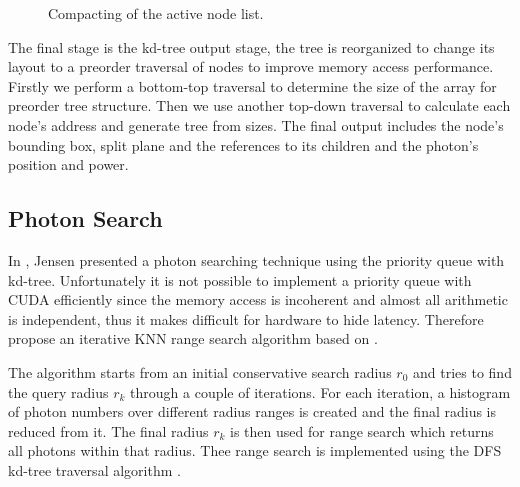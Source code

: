 \begin{figure}[ftp] 
    \centering 
    \renewcommand{\thefigure}{\thechapter.\arabic{figure}}
    \caption[]{Compacting of the active node list.}
    \label{fig:compact_active_list} 
\end{figure} 

The final stage is the kd-tree output stage, the tree is reorganized to change its layout to a preorder traversal of nodes to improve memory access performance. Firstly we perform a bottom-top traversal to determine the size of the array for preorder tree structure. Then we use another top-down traversal to calculate each node's address and generate tree from sizes. The final output includes the node's bounding box, split plane and the references to its children and the photon's position and power. 

\subsection{Photon Search}
In \cite{HenrikWannJensen2004}, Jensen presented a photon searching technique using the priority queue with kd-tree. Unfortunately it is not possible to implement a priority queue with CUDA efficiently since the memory access is incoherent and almost all arithmetic is independent, thus it makes difficult for hardware to hide latency. Therefore \citeauthor{Zhou2008} propose an iterative KNN range search algorithm based on \cite{Preparata:1985:CGI:4333}. 

The algorithm starts from an initial conservative search radius \(r_{0}\) and tries to find the query radius \(r_{k}\) through a couple of iterations. For each iteration, a histogram of photon numbers over different radius ranges is created and the final radius is reduced from it. The final radius \(r_{k}\) is then used for range search which returns all photons within that radius. Thee range search is implemented using the DFS kd-tree traversal algorithm \cite{Preparata:1985:CGI:4333}. 

